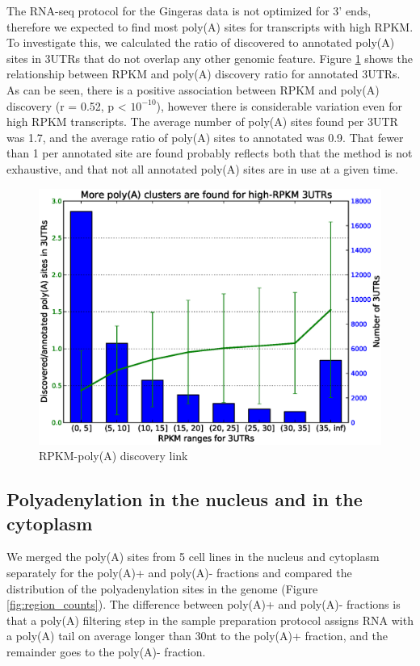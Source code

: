 \documentclass[a4paper]{article}
\begin{document}
The RNA-seq protocol for the Gingeras data is not optimized for 3' ends,
therefore we expected to find most poly(A) sites for transcripts with high RPKM. To
investigate this, we calculated the ratio of discovered to annotated poly(A) sites
in 3UTRs that do not overlap any other genomic feature. Figure \ref{fig:RPKM}
shows the relationship between RPKM and poly(A) discovery ratio for annotated
3UTRs. As can be seen, there is a positive association between RPKM and
poly(A) discovery (r = 0.52, p < $10^{-10}$), however there is considerable
variation even for high RPKM transcripts. The average number of poly(A) sites
found per 3UTR was 1.7, and the average ratio of poly(A) sites to annotated was
0.9. That fewer than 1 per annotated site are found probably reflects both that
the method is not exhaustive, and that not all annotated poly(A) sites are in
use at a given time.

\begin{figure}[h]
	\centering
		\includegraphics[scale=0.5]{../Figures/More_polyA_clusters_for_high_RPKM_3UTRS.eps}
	\caption{RPKM-poly(A) discovery link}
	\label{fig:RPKM}
\end{figure}
\subsection{Polyadenylation in the nucleus and in the cytoplasm}

We merged the poly(A) sites from 5 cell lines in the nucleus and cytoplasm
separately for the poly(A)+ and poly(A)- fractions and compared the
distribution of the polyadenylation sites in the genome (Figure
\ref{fig:region_counts}). The difference between poly(A)+ and poly(A)-
fractions is that a poly(A) filtering step in the sample preparation protocol
assigns RNA with a poly(A) tail on average longer than 30nt to the poly(A)+
fraction, and the remainder goes to the poly(A)- fraction.
\end{document}
